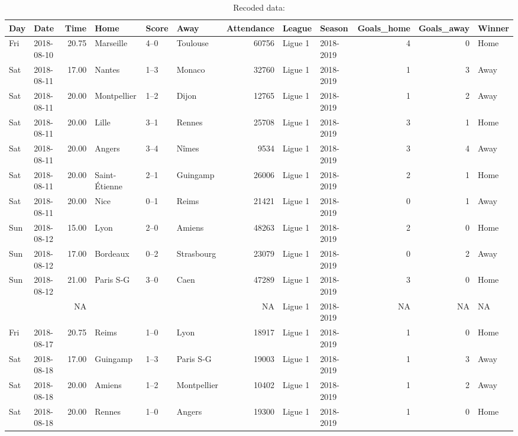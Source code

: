 \documentclass[
]{article}
\begin{document}
\begin{table}

\caption{\label{tab:unnamed-chunk-3}Recoded data:}
\centering
\begin{tabular}[t]{llrlllrllrrl}
\toprule
Day & Date & Time & Home & Score & Away & Attendance & League & Season & Goals\_home & Goals\_away & Winner\\
\midrule
Fri & 2018-08-10 & 20.75 & Marseille & 4–0 & Toulouse & 60756 & Ligue 1 & 2018-2019 & 4 & 0 & Home\\
Sat & 2018-08-11 & 17.00 & Nantes & 1–3 & Monaco & 32760 & Ligue 1 & 2018-2019 & 1 & 3 & Away\\
Sat & 2018-08-11 & 20.00 & Montpellier & 1–2 & Dijon & 12765 & Ligue 1 & 2018-2019 & 1 & 2 & Away\\
Sat & 2018-08-11 & 20.00 & Lille & 3–1 & Rennes & 25708 & Ligue 1 & 2018-2019 & 3 & 1 & Home\\
Sat & 2018-08-11 & 20.00 & Angers & 3–4 & Nîmes & 9534 & Ligue 1 & 2018-2019 & 3 & 4 & Away\\
\addlinespace
Sat & 2018-08-11 & 20.00 & Saint-Étienne & 2–1 & Guingamp & 26006 & Ligue 1 & 2018-2019 & 2 & 1 & Home\\
Sat & 2018-08-11 & 20.00 & Nice & 0–1 & Reims & 21421 & Ligue 1 & 2018-2019 & 0 & 1 & Away\\
Sun & 2018-08-12 & 15.00 & Lyon & 2–0 & Amiens & 48263 & Ligue 1 & 2018-2019 & 2 & 0 & Home\\
Sun & 2018-08-12 & 17.00 & Bordeaux & 0–2 & Strasbourg & 23079 & Ligue 1 & 2018-2019 & 0 & 2 & Away\\
Sun & 2018-08-12 & 21.00 & Paris S-G & 3–0 & Caen & 47289 & Ligue 1 & 2018-2019 & 3 & 0 & Home\\
\addlinespace
 &  & NA &  &  &  & NA & Ligue 1 & 2018-2019 & NA & NA & NA\\
Fri & 2018-08-17 & 20.75 & Reims & 1–0 & Lyon & 18917 & Ligue 1 & 2018-2019 & 1 & 0 & Home\\
Sat & 2018-08-18 & 17.00 & Guingamp & 1–3 & Paris S-G & 19003 & Ligue 1 & 2018-2019 & 1 & 3 & Away\\
Sat & 2018-08-18 & 20.00 & Amiens & 1–2 & Montpellier & 10402 & Ligue 1 & 2018-2019 & 1 & 2 & Away\\
Sat & 2018-08-18 & 20.00 & Rennes & 1–0 & Angers & 19300 & Ligue 1 & 2018-2019 & 1 & 0 & Home\\
\bottomrule
\end{tabular}
\end{table}
\end{document}
